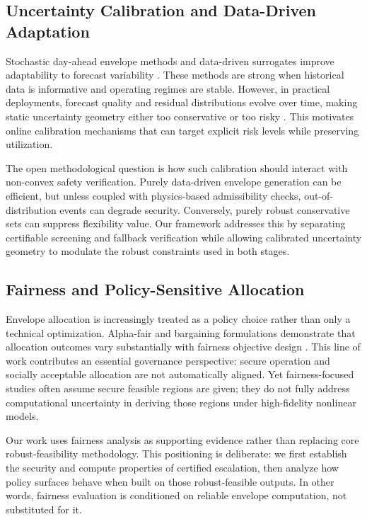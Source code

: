 \documentclass{article} %
\begin{document}
\subsection{Uncertainty Calibration and Data-Driven Adaptation}
Stochastic day-ahead envelope methods and data-driven surrogates improve adaptability to forecast variability \citep{KA04,KA06,KA07}. These methods are strong when historical data is informative and operating regimes are stable. However, in practical deployments, forecast quality and residual distributions evolve over time, making static uncertainty geometry either too conservative or too risky \citep{KA03,KA35}. This motivates online calibration mechanisms that can target explicit risk levels while preserving utilization.

The open methodological question is how such calibration should interact with non-convex safety verification. Purely data-driven envelope generation can be efficient, but unless coupled with physics-based admissibility checks, out-of-distribution events can degrade security. Conversely, purely robust conservative sets can suppress flexibility value. Our framework addresses this by separating certifiable screening and fallback verification while allowing calibrated uncertainty geometry to modulate the robust constraints used in both stages.

\subsection{Fairness and Policy-Sensitive Allocation}
Envelope allocation is increasingly treated as a policy choice rather than only a technical optimization. Alpha-fair and bargaining formulations demonstrate that allocation outcomes vary substantially with fairness objective design \citep{KA08,KA10,KA16,KA17}. This line of work contributes an essential governance perspective: secure operation and socially acceptable allocation are not automatically aligned. Yet fairness-focused studies often assume secure feasible regions are given; they do not fully address computational uncertainty in deriving those regions under high-fidelity nonlinear models.

Our work uses fairness analysis as supporting evidence rather than replacing core robust-feasibility methodology. This positioning is deliberate: we first establish the security and compute properties of certified escalation, then analyze how policy surfaces behave when built on those robust-feasible outputs. In other words, fairness evaluation is conditioned on reliable envelope computation, not substituted for it.
\end{document}
